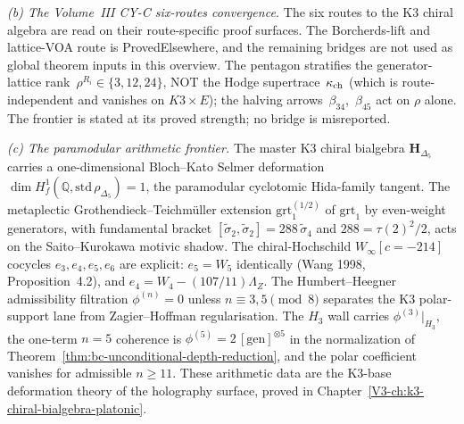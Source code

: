\noindent\emph{(b) The Volume~III CY-C six-routes
convergence.}\enspace
The six routes to the K3 chiral algebra are read on their
route-specific proof surfaces. The Borcherds-lift and lattice-VOA
route is ProvedElsewhere, and the remaining bridges are not used as
global theorem inputs in this overview. The pentagon stratifies the
generator-lattice rank~$\rho^{R_i}\in\{3,12,24\}$, NOT the Hodge
supertrace~$\kappa_{\mathrm{ch}}$ (which is route-independent and vanishes on
$K3\times E$); the halving arrows~$\beta_{34}$,~$\beta_{45}$ act on
$\rho$ alone. The frontier is stated at its proved strength; no
bridge is misreported.

\medskip

\noindent\emph{(c) The paramodular arithmetic frontier.}\enspace
The master K3 chiral bialgebra $\mathbf H_{\Delta_5}$ carries a
one-dimensional Bloch--Kato Selmer deformation
$\dim H^1_f(\mathbb Q,\mathrm{std}\,\rho_{\Delta_5}) = 1$, the
paramodular cyclotomic Hida-family tangent. The
metaplectic Grothendieck--Teichm\"uller extension
$\mathrm{grt}_1^{(1/2)}$ of $\mathrm{grt}_1$ by even-weight
generators, with fundamental bracket
$[\widetilde\sigma_2,\widetilde\sigma_2] = 288\,\widetilde\sigma_4$
and $288 = \tau(2)^2/2$, acts on the Saito--Kurokawa motivic
shadow. The chiral-Hochschild $W_\infty[c=-214]$ cocycles
$e_3,e_4,e_5,e_6$ are explicit: $e_5 = W_5$ identically (Wang 1998,
Proposition~4.2), and $e_4 = W_4 - (107/11)\Lambda_Z$. The
Humbert--Heegner admissibility filtration
$\phi^{(n)}=0$ unless $n\equiv 3,5\pmod 8$ separates the K3
polar-support lane from Zagier--Hoffman regularisation. The $H_3$
wall carries $\phi^{(3)}|_{H_3}$, the one-term $n=5$ coherence is
$\phi^{(5)} = 2\,[\mathrm{gen}]^{\otimes 5}$ in the normalization of
Theorem~\ref{thm:bc-unconditional-depth-reduction}, and the polar
coefficient vanishes for admissible $n\ge 11$. These
arithmetic data are the K3-base deformation theory of the holography
surface, proved in Chapter~\ref{V3-ch:k3-chiral-bialgebra-platonic}.

\medskip

